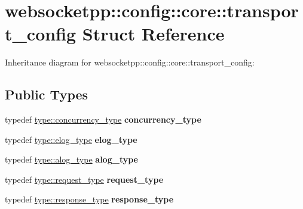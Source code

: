 \hypertarget{structwebsocketpp_1_1config_1_1core_1_1transport__config}{}\section{websocketpp\+:\+:config\+:\+:core\+:\+:transport\+\_\+config Struct Reference}
\label{structwebsocketpp_1_1config_1_1core_1_1transport__config}


Inheritance diagram for websocketpp\+:\+:config\+:\+:core\+:\+:transport\+\_\+config\+:
\subsection*{Public Types}
\begin{DoxyCompactItemize}
\item 
\mbox{\label{structwebsocketpp_1_1config_1_1core_1_1transport__config_a373a58261c0eaf203726b6a62436362a}} 
typedef \mbox{\hyperlink{classwebsocketpp_1_1concurrency_1_1basic}{type\+::concurrency\+\_\+type}} {\bfseries concurrency\+\_\+type}
\item 
\mbox{\label{structwebsocketpp_1_1config_1_1core_1_1transport__config_ae7514c1c62b41184ec7133de469ab3ae}} 
typedef \mbox{\hyperlink{structwebsocketpp_1_1config_1_1core_ac037ffb73b675a6251f3b86433b4eb17}{type\+::elog\+\_\+type}} {\bfseries elog\+\_\+type}
\item 
\mbox{\label{structwebsocketpp_1_1config_1_1core_1_1transport__config_aba152072bfdf296a067d5f860401824d}} 
typedef \mbox{\hyperlink{classwebsocketpp_1_1log_1_1basic}{type\+::alog\+\_\+type}} {\bfseries alog\+\_\+type}
\item 
\mbox{\label{structwebsocketpp_1_1config_1_1core_1_1transport__config_aab3b5759b5b1f8c06da99319612c061c}} 
typedef \mbox{\hyperlink{classwebsocketpp_1_1http_1_1parser_1_1request}{type\+::request\+\_\+type}} {\bfseries request\+\_\+type}
\item 
\mbox{\label{structwebsocketpp_1_1config_1_1core_1_1transport__config_a93430d48551cc6d5cdee09d54840eb76}} 
typedef \mbox{\hyperlink{classwebsocketpp_1_1http_1_1parser_1_1response}{type\+::response\+\_\+type}} {\bfseries response\+\_\+type}
\end{DoxyCompactItemize}
